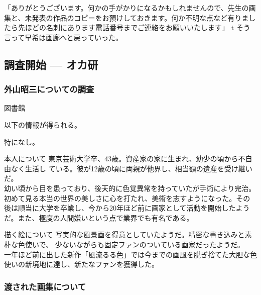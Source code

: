 \documentclass[a4paper,8pt,min]{jsarticle}
\begin{document}
「ありがとうございます。何かの手がかりになるかもしれませんので、先生の画
集と、未発表の作品のコピーをお預けしておきます。何か不明な点など有りまし
たら先ほどの名刺にあります電話番号までご連絡をお願いいたします」
t
そう言って早希は画廊へと戻っていった。

\subsection{調査開始 --- オカ研}
\subsubsection{外山昭三についての調査}

\begin{judge}{図書館}
 \item 以下の情報が得られる。
 \item 特になし。
\end{judge}

\begin{topic}
  \item[本人について]
 東京芸術大学卒、43歳。資産家の家に生まれ、幼少の頃から不自由なく生活し
 ている。彼が12歳の頃に両親が他界し、相当額の遺産を受け継いだ。\\
 幼い頃から目を患っており、後天的に色覚異常を持っていたが手術により完治。
 初めて見る本当の世界の美しさに心を打たれ、美術を志すようになった。その
 後は順当に大学を卒業し、今から20年ほど前に画家として活動を開始したよう
 だ。また、極度の人間嫌いという点で業界でも有名である。

  \item[描く絵について]
  写実的な風景画を得意としていたようだ。精密な書き込みと素朴な色使いで、
  少ないながらも固定ファンのついている画家だったようだ。\\
  一年ほど前に出した新作「風流るる色」では今までの画風を脱ぎ捨てた大胆な色
  使いの新境地に達し、新たなファンを獲得した。
\end{topic}

\subsubsection{渡された画集について}
\end{document}
